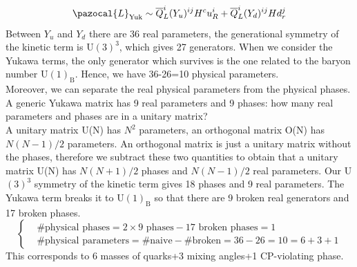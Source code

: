 \documentclass[../main.tex]{subfiles}
\begin{document}
\[
\pazocal{L}_{\text{Yuk}}\sim\overline{Q}_L^i(Y_u)^{ij}H^cu_R^i+\overline{Q}_L^i(Y_d)^{ij}Hd_r^j
\]
Between $Y_u$ and $Y_d$ there are 36 real parameters, the generational symmetry of the kinetic term is U$(3)^3$, which gives 27 generators. When we consider the Yukawa terms, the only generator which survives is the one related to the baryon number U$(1)_{\text{B}}$. Hence, we have 36-26=10 physical parameters.\\ 
Moreover, we can separate the real physical parameters from the physical phases. A generic Yukawa matrix has 9 real parameters and 9 phases: how many real parameters and phases are in a unitary matrix?\\
A unitary matrix U(N) has $N^2$ parameters, an orthogonal matrix O(N) has $N(N-1)/2$ parameters. An orthogonal matrix is just a unitary matrix without the phases, therefore we subtract these two quantities to obtain that a unitary matrix U(N) has $N(N+1)/2$ phases and $N(N-1)/2$ real parameters. Our U$(3)^3$ symmetry of the kinetic term gives 18 phases and 9 real parameters. The Yukawa term breaks it to U$(1)_{\text{B}}$ so that there are 9 broken real generators and 17 broken phases.
\[
\left\{
\begin{aligned}
&\text{\# physical phases}=2\times9\text{ phases}-17\text{ broken phases}=1\\
&\text{\# physical parameters}=\#\text{naive}-\#\text{broken}=36-26=10=6+3+1
\end{aligned}
\right.
\]
This corresponds to 6 masses of quarks+3 mixing angles+1 CP-violating phase.
\end{document}
